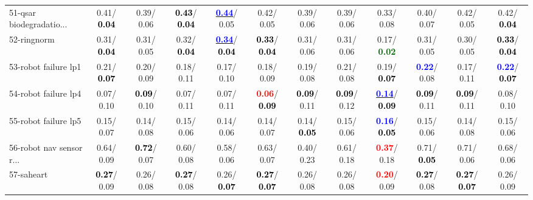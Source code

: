 \begin{table}[h]
\begin{center}
{\begin{tabular}{lc|c|c|c|c|c|c|c|c|c|c}
51-qsar biodegradatio... &   0.41/\textcolor{black}{\textbf{  0.04}} &   0.39/  0.06 & \textcolor{black}{\textbf{  0.43}}/\textcolor{black}{\textbf{  0.04}} & \underline{\textcolor{blue}{\textbf{  0.44}}}/  0.05 &   0.42/  0.05 &   0.39/  0.06 &   0.39/  0.06 &   0.33/  0.08 &   0.40/  0.07 &   0.42/  0.05 &   0.42/\textcolor{black}{\textbf{  0.04}} \\
52-ringnorm &   0.31/\textcolor{black}{\textbf{  0.04}} &   0.31/  0.05 &   0.32/\textcolor{black}{\textbf{  0.04}} & \underline{\textcolor{blue}{\textbf{  0.34}}}/\textcolor{black}{\textbf{  0.04}} & \textcolor{black}{\textbf{  0.33}}/\textcolor{black}{\textbf{  0.04}} &   0.31/  0.06 &   0.31/  0.06 &   0.17/\textcolor{darkgreen}{\textbf{  0.02}} &   0.31/  0.05 &   0.30/  0.05 & \textcolor{black}{\textbf{  0.33}}/\textcolor{black}{\textbf{  0.04}} \\
53-robot failure lp1 &   0.21/\textcolor{black}{\textbf{  0.07}} &   0.20/  0.09 &   0.18/  0.11 &   0.17/  0.10 &   0.18/  0.09 &   0.19/  0.08 &   0.21/  0.08 &   0.19/\textcolor{black}{\textbf{  0.07}} & \textcolor{blue}{\textbf{  0.22}}/  0.08 &   0.17/  0.11 & \textcolor{blue}{\textbf{  0.22}}/\textcolor{black}{\textbf{  0.07}} \\ \hline
54-robot failure lp4 &   0.07/  0.10 & \textcolor{black}{\textbf{  0.09}}/  0.10 &   0.07/  0.11 &   0.07/  0.11 & \textcolor{red}{\textbf{  0.06}}/\textcolor{black}{\textbf{  0.09}} & \textcolor{black}{\textbf{  0.09}}/  0.11 & \textcolor{black}{\textbf{  0.09}}/  0.12 & \underline{\textcolor{blue}{\textbf{  0.14}}}/\textcolor{black}{\textbf{  0.09}} & \textcolor{black}{\textbf{  0.09}}/  0.11 & \textcolor{black}{\textbf{  0.09}}/  0.11 &   0.08/  0.10 \\
55-robot failure lp5 &   0.15/  0.07 &   0.14/  0.08 &   0.15/  0.06 &   0.14/  0.06 &   0.14/  0.07 &   0.14/\textcolor{black}{\textbf{  0.05}} &   0.15/  0.06 & \textcolor{blue}{\textbf{  0.16}}/\textcolor{black}{\textbf{  0.05}} &   0.15/  0.06 &   0.14/  0.08 &   0.15/  0.06 \\
56-robot nav sensor r... &   0.64/  0.09 & \textcolor{black}{\textbf{  0.72}}/  0.07 &   0.60/  0.08 &   0.58/  0.06 &   0.63/  0.07 &   0.40/  0.23 &   0.61/  0.18 & \textcolor{red}{\textbf{  0.37}}/  0.18 &   0.71/\textcolor{black}{\textbf{  0.05}} &   0.71/  0.06 &   0.68/  0.06 \\
57-saheart & \textcolor{black}{\textbf{  0.27}}/  0.09 &   0.26/  0.08 & \textcolor{black}{\textbf{  0.27}}/  0.08 &   0.26/\textcolor{black}{\textbf{  0.07}} & \textcolor{black}{\textbf{  0.27}}/\textcolor{black}{\textbf{  0.07}} &   0.26/  0.08 &   0.26/  0.08 & \textcolor{red}{\textbf{  0.20}}/  0.09 & \textcolor{black}{\textbf{  0.27}}/  0.08 & \textcolor{black}{\textbf{  0.27}}/\textcolor{black}{\textbf{  0.07}} &   0.26/  0.09 \\

\end{tabular}}
\end{center}
\end{table}
